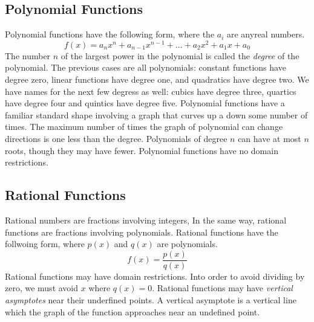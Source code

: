 \documentclass[fleqn]{report}
\begin{document}
\subsection*{Polynomial Functions}

Polynomial functions have the following form, where the $a_i$
are anyreal numbers.
\begin{equation*}
f(x) = a_nx^n + a_{n-1}x^{n-1} + \ldots + a_2x^2 + a_1 x + a_0
\end{equation*}
The number $n$ of the largest power in the polynomial is
called the \emph{degree} of the polynomial. The previous
cases are all polynomials: constant functions have degree
zero, linear functions have degree one, and quadratics have
degree two. We have names for the next few degress as well:
cubics have degree three, quartics have degree four and
quintics have degree five. Polynomial functions have a
familiar standard shape involving a graph that curves up a
down some number of times. The maximum number of times the
graph of polynomial can change directions is one less than the
degree. Polynomials of degree $n$ can have at most $n$ roots,
though they may have fewer. Polynomial functions have no
domain restrictions. 

\subsection*{Rational Functions}

Rational numbers are fractions involving integers, In the same
way, rational functions are fractions involving polynomials.
Rational functions have the follwoing form, where $p(x)$ and
$q(x)$ are polynomials.
\begin{equation*}
f(x) = \frac{p(x)}{q(x)} 
\end{equation*}
Rational functions may have domain
restrictions. Into order to avoid dividing by zero, we must
avoid $x$ where $q(x) = 0$. Rational functions may have
\emph{vertical asymptotes} near their underfined points. A
vertical asymptote is a vertical line which the graph of the 
function approaches near an undefined point. 
\end{document}

